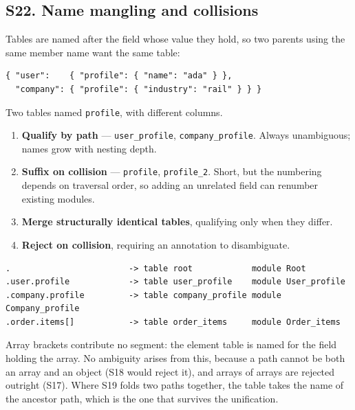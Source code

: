 \subsection*{S22. Name mangling and collisions}

Tables are named after the field whose value they hold, so two parents using
the same member name want the same table:

\begin{lstlisting}[style=json]
{ "user":    { "profile": { "name": "ada" } },
  "company": { "profile": { "industry": "rail" } } }
\end{lstlisting}

\noindent
Two tables named \texttt{profile}, with different columns.

\options
\begin{enumerate}[label=\textbf{(\alph*)}]
  \item \textbf{Qualify by path} --- \texttt{user\_profile},
        \texttt{company\_profile}. Always unambiguous; names grow with nesting
        depth. \selected
  \item \textbf{Suffix on collision} --- \texttt{profile},
        \texttt{profile\_2}. Short, but the numbering depends on traversal
        order, so adding an unrelated field can renumber existing modules.
  \item \textbf{Merge structurally identical tables}, qualifying only when
        they differ.
  \item \textbf{Reject on collision}, requiring an annotation to
        disambiguate.
\end{enumerate}


\begin{lstlisting}[style=json]
.                        -> table root            module Root
.user.profile            -> table user_profile    module User_profile
.company.profile         -> table company_profile module Company_profile
.order.items[]           -> table order_items     module Order_items
\end{lstlisting}

Array brackets contribute no segment: the element table is named for the field
holding the array. No ambiguity arises from this, because a path cannot be
both an array and an object (S18 would reject it), and arrays of arrays are
rejected outright (S17). Where S19 folds two paths together, the table takes
the name of the ancestor path, which is the one that survives the
unification.

